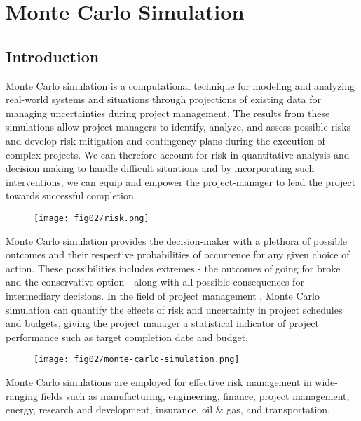 \let\textcircled=\pgftextcircled
\chapter{Monte Carlo Simulation}
\label{chap:litrev}
\section{Introduction}
Monte Carlo simulation is a computational technique for modeling and analyzing real-world systems and situations through projections of existing data for managing uncertainties during project management. The results from these simulations allow project-managers to identify, analyze, and assess possible risks and develop risk mitigation and contingency plans during the execution of complex projects. We can therefore account for risk in quantitative analysis and decision making to handle difficult situations and by incorporating such interventions, we can equip and empower the project-manager to lead the project towards successful completion. 

\begin{figure}
	\centering
	\texttt{[image: fig02/risk.png]}
\end{figure}

Monte Carlo simulation \cite{mcoutcomes} provides the decision-maker with a plethora of possible outcomes and their respective probabilities of occurrence for any given choice of action. These possibilities includes extremes - the outcomes of going for broke and the conservative option - along with all possible consequences for intermediary decisions. In the field of project management \cite{article2}, Monte Carlo simulation can quantify the effects of risk and uncertainty in project schedules and budgets, giving the project manager a statistical indicator of project performance such as target completion date and budget.


\begin{figure}
	\centering
	\texttt{[image: fig02/monte-carlo-simulation.png]}
\end{figure}

Monte Carlo simulations are employed for effective risk management \cite{MCinvest} in wide-ranging fields such as manufacturing, engineering, finance, project management, energy, research and development, insurance, oil \& gas, and transportation. 

